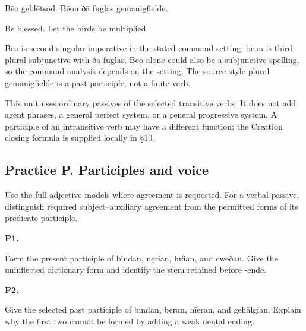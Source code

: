Bēo geblētsod. Bēon ðā fuglas gemanigfielde.

Be blessed. Let the birds be multiplied.

Bēo is second-singular imperative in the stated command setting; bēon is third-plural subjunctive with ðā fuglas. Bēo alone could also be a subjunctive spelling, so the command analysis depends on the setting. The source-style plural gemanigfielde is a past participle, not a finite verb.

This unit uses ordinary passives of the selected transitive verbs. It does not add agent phrases, a general perfect system, or a general progressive system. A participle of an intransitive verb may have a different function; the Creation closing formula is supplied locally in §10.

\subsection*{Practice P. Participles and voice}

Use the full adjective models where agreement is requested. For a verbal passive, distinguish required subject–auxiliary agreement from the permitted forms of its predicate participle.

\par\begin{minipage}{\linewidth}\raggedright
\textbf{P1.}

Form the present participle of bindan, nęrian, lufian, and cweðan. Give the uninflected dictionary form and identify the stem retained before -ende.

\end{minipage}\par\addvspace{4pt}

\par\begin{minipage}{\linewidth}\raggedright
\textbf{P2.}

Give the selected past participle of bindan, beran, hīeran, and gehālgian. Explain why the first two cannot be formed by adding a weak dental ending.

\end{minipage}\par\addvspace{4pt}

